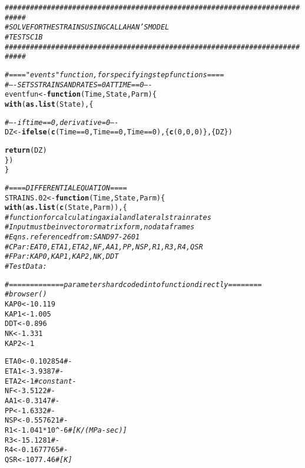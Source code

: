 \documentclass{article}\usepackage[]{graphicx}\usepackage[]{color}
\makeatletter
\newcommand{\hlnum}[1]{\textcolor[rgb]{0.686,0.059,0.569}{#1}}%
\newcommand{\hlcom}[1]{\textcolor[rgb]{0.678,0.584,0.686}{\textit{#1}}}%
\newcommand{\hlopt}[1]{\textcolor[rgb]{0,0,0}{#1}}%
\newcommand{\hlstd}[1]{\textcolor[rgb]{0.345,0.345,0.345}{#1}}%
\newcommand{\hlkwa}[1]{\textcolor[rgb]{0.161,0.373,0.58}{\textbf{#1}}}%
\newcommand{\hlkwb}[1]{\textcolor[rgb]{0.69,0.353,0.396}{#1}}%
\newcommand{\hlkwc}[1]{\textcolor[rgb]{0.333,0.667,0.333}{#1}}%
\newcommand{\hlkwd}[1]{\textcolor[rgb]{0.737,0.353,0.396}{\textbf{#1}}}%
\newenvironment{kframe}{%
 \def\at@end@of@kframe{}%
 \ifinner\ifhmode%
  \def\at@end@of@kframe{\end{minipage}}%
  \begin{minipage}{\columnwidth}%
 \fi\fi%
 \def\FrameCommand##1{\hskip\@totalleftmargin \hskip-\fboxsep
 \colorbox{shadecolor}{##1}\hskip-\fboxsep
     \hskip-\linewidth \hskip-\@totalleftmargin \hskip\columnwidth}%
 \MakeFramed {\advance\hsize-\width
   \@totalleftmargin\z@ \linewidth\hsize
   \@setminipage}}%
 {\par\unskip\endMakeFramed%
 \at@end@of@kframe}
\newenvironment{knitrout}{}{} %
\makeatother
\begin{document}
\newpage
\begin{knitrout}
\color{fgcolor}\begin{kframe}
\begin{alltt}
\hlcom{###########################################################################}
\hlcom{# SOLVE FOR THE STRAINS USING CALLAHAN'S MODEL}
\hlcom{# TEST SC1B}
\hlcom{###########################################################################}

\hlcom{# ==== "events" function, for specifying step functions ====}
\hlcom{# ---- SETS STRAINS AND RATES = 0 AT TIME == 0 ----}
\hlstd{eventfun} \hlkwb{<-} \hlkwa{function}\hlstd{(}\hlkwc{Time}\hlstd{,} \hlkwc{State}\hlstd{,} \hlkwc{Parm}\hlstd{)\{}
  \hlkwd{with} \hlstd{(}\hlkwd{as.list}\hlstd{(State),\{}

    \hlcom{# ---- if time == 0, derivative = 0 ----}
    \hlstd{DZ} \hlkwb{<-} \hlkwd{ifelse}\hlstd{(}\hlkwd{c}\hlstd{(Time} \hlopt{==} \hlnum{0}\hlstd{, Time} \hlopt{==} \hlnum{0}\hlstd{, Time} \hlopt{==} \hlnum{0}\hlstd{), \{}\hlkwd{c}\hlstd{(}\hlnum{0}\hlstd{,} \hlnum{0}\hlstd{,} \hlnum{0}\hlstd{)\}, \{DZ\})}

    \hlkwd{return}\hlstd{(DZ)}
  \hlstd{\})}
\hlstd{\}}

\hlcom{# ==== DIFFERENTIAL EQUATION ====}
\hlstd{STRAINS.02} \hlkwb{<-} \hlkwa{function}\hlstd{(}\hlkwc{Time}\hlstd{,} \hlkwc{State}\hlstd{,} \hlkwc{Parm}\hlstd{)\{}
  \hlkwd{with}\hlstd{(}\hlkwd{as.list}\hlstd{(}\hlkwd{c}\hlstd{(State, Parm)),\{}
    \hlcom{# function for calculating axial and lateral strain rates}
    \hlcom{# Input must be in vector or matrix form, no data frames}
    \hlcom{# Eqns. referenced from:  SAND97-2601}
    \hlcom{# CPar: EAT0, ETA1, ETA2, NF, AA1, PP, NSP, R1, R3, R4, QSR}
    \hlcom{# FPar: KAP0, KAP1, KAP2, NK, DDT}
    \hlcom{# TestData:}

    \hlcom{# ============= parameters hard coded into function directly ========}
    \hlcom{# browser()}
    \hlstd{KAP0} \hlkwb{<-} \hlnum{10.119}
    \hlstd{KAP1} \hlkwb{<-} \hlnum{1.005}
    \hlstd{DDT}  \hlkwb{<-} \hlnum{0.896}
    \hlstd{NK}   \hlkwb{<-} \hlnum{1.331}
    \hlstd{KAP2} \hlkwb{<-} \hlnum{1}

    \hlstd{ETA0}  \hlkwb{<-} \hlnum{0.102854}        \hlcom{# -}
    \hlstd{ETA1}  \hlkwb{<-} \hlnum{3.9387}          \hlcom{# -}
    \hlstd{ETA2}   \hlkwb{<-} \hlnum{1}               \hlcom{# constant -}
    \hlstd{NF}          \hlkwb{<-} \hlnum{3.5122}          \hlcom{# -}
    \hlstd{AA1}         \hlkwb{<-} \hlnum{0.3147}          \hlcom{# -}
    \hlstd{PP}          \hlkwb{<-} \hlnum{1.6332}          \hlcom{# -}
    \hlstd{NSP}         \hlkwb{<-} \hlnum{0.557621}        \hlcom{# -}
    \hlstd{R1}          \hlkwb{<-} \hlnum{1.041} \hlopt{*} \hlnum{10} \hlopt{^ -}\hlnum{6} \hlcom{# [K/(MPa-sec)]}
    \hlstd{R3}          \hlkwb{<-} \hlnum{15.1281}         \hlcom{# -}
    \hlstd{R4}          \hlkwb{<-} \hlnum{0.1677765}       \hlcom{# -}
    \hlstd{QSR}         \hlkwb{<-} \hlnum{1077.46}         \hlcom{# [K]}


\end{alltt}
\end{kframe}
\end{knitrout}
\end{document}
